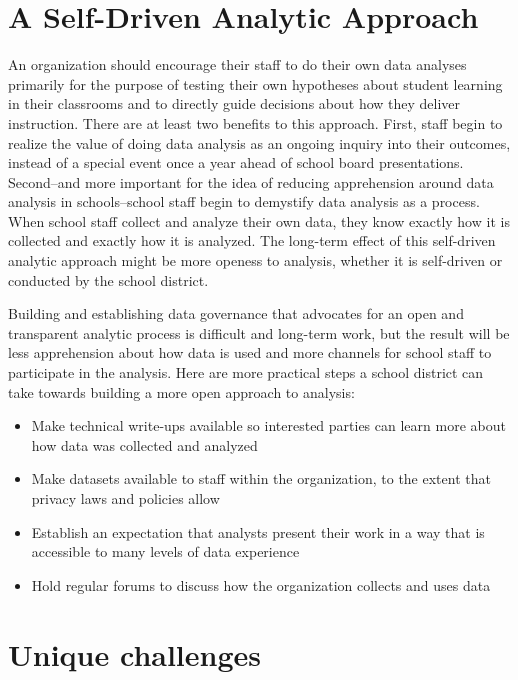 \documentclass[]{book}
\providecommand{\tightlist}{%
  \setlength{\itemsep}{0pt}\setlength{\parskip}{0pt}}
\begin{document}
\section{A Self-Driven Analytic
Approach}\label{a-self-driven-analytic-approach}

An organization should encourage their staff to do their own data
analyses primarily for the purpose of testing their own hypotheses about
student learning in their classrooms and to directly guide decisions
about how they deliver instruction. There are at least two benefits to
this approach. First, staff begin to realize the value of doing data
analysis as an ongoing inquiry into their outcomes, instead of a special
event once a year ahead of school board presentations. Second--and more
important for the idea of reducing apprehension around data analysis in
schools--school staff begin to demystify data analysis as a process.
When school staff collect and analyze their own data, they know exactly
how it is collected and exactly how it is analyzed. The long-term effect
of this self-driven analytic approach might be more openess to analysis,
whether it is self-driven or conducted by the school district.

Building and establishing data governance that advocates for an open and
transparent analytic process is difficult and long-term work, but the
result will be less apprehension about how data is used and more
channels for school staff to participate in the analysis. Here are more
practical steps a school district can take towards building a more open
approach to analysis:

\begin{itemize}
\tightlist
\item
  Make technical write-ups available so interested parties can learn
  more about how data was collected and analyzed
\item
  Make datasets available to staff within the organization, to the
  extent that privacy laws and policies allow
\item
  Establish an expectation that analysts present their work in a way
  that is accessible to many levels of data experience
\item
  Hold regular forums to discuss how the organization collects and uses
  data
\end{itemize}

\section{Unique challenges}\label{unique-challenges-1}
\end{document}

